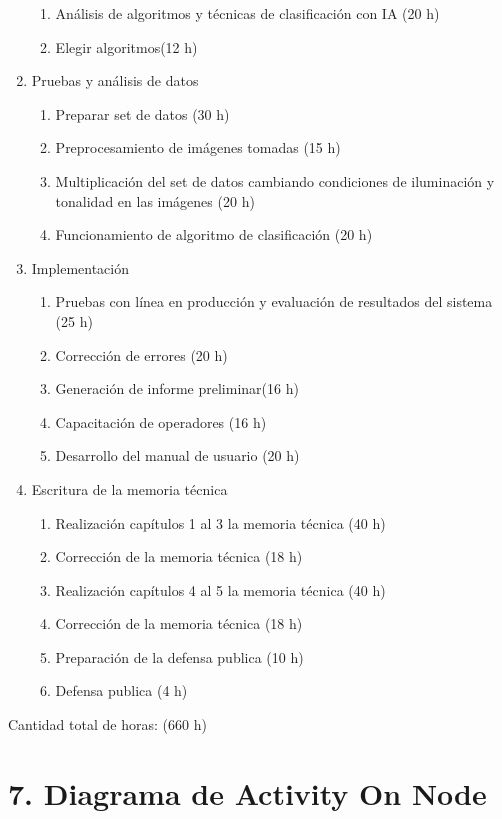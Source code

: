 \documentclass[11pt]{charter}
\begin{document}
\begin{enumerate}
\begin{enumerate}
	\item Análisis de algoritmos y técnicas de clasificación con IA (20 h)
	\item Elegir algoritmos(12 h)
	\end{enumerate}
\item Pruebas y análisis de datos
	\begin{enumerate}
	\item Preparar set de datos (30 h)
	\item Preprocesamiento de imágenes tomadas (15 h)
	\item Multiplicación del set de datos cambiando condiciones de iluminación y tonalidad en las imágenes (20 h)
	\item Funcionamiento de algoritmo de clasificación (20 h)
	\end{enumerate}
\item Implementación
	\begin{enumerate}
	\item Pruebas con línea en producción y evaluación de resultados del sistema (25 h)
	\item Corrección de errores (20 h)
	\item Generación de informe preliminar(16 h)
	\item Capacitación de operadores (16 h)
	\item Desarrollo del manual de usuario (20 h)
	\end{enumerate}
\item Escritura de la memoria técnica
	\begin{enumerate}
	\item Realización capítulos 1 al 3 la memoria técnica (40 h) 
	\item Corrección de la memoria técnica (18 h)
	\item Realización capítulos 4 al 5 la memoria técnica (40 h)
	\item Corrección de la memoria técnica (18 h)
	\item Preparación de la defensa publica (10 h)
	\item Defensa publica (4 h)
	
	\end{enumerate}

\end{enumerate}

Cantidad total de horas: (660 h)



\section{7. Diagrama de Activity On Node}
\label{sec:AoN}
\end{document}
